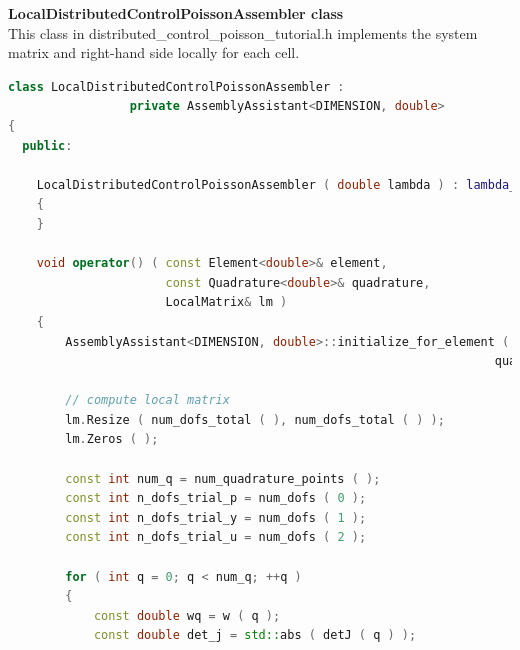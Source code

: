\documentclass[a4paper, 11pt, twoside]{article}
\begin{document}
\textbf{LocalDistributedControlPoissonAssembler class}\\
This class in distributed\_control\_poisson\_tutorial.h implements the system matrix and right-hand side locally for each cell.

\begin{lstlisting}[language=C++, basicstyle={\footnotesize, \ttfamily}, keywordstyle=\color{blue}, numbers=none, tabsize=4]
class LocalDistributedControlPoissonAssembler : 
                 private AssemblyAssistant<DIMENSION, double>
{
  public:

    LocalDistributedControlPoissonAssembler ( double lambda ) : lambda_ ( lambda )
    {
    }

    void operator() ( const Element<double>& element, 
                      const Quadrature<double>& quadrature,
                      LocalMatrix& lm )
    {
        AssemblyAssistant<DIMENSION, double>::initialize_for_element ( element, 
                                                                    quadrature );

        // compute local matrix
        lm.Resize ( num_dofs_total ( ), num_dofs_total ( ) );
        lm.Zeros ( );

        const int num_q = num_quadrature_points ( );
        const int n_dofs_trial_p = num_dofs ( 0 );
        const int n_dofs_trial_y = num_dofs ( 1 );
        const int n_dofs_trial_u = num_dofs ( 2 );

        for ( int q = 0; q < num_q; ++q )
        {
            const double wq = w ( q );
            const double det_j = std::abs ( detJ ( q ) );


\end{lstlisting}
\end{document}
